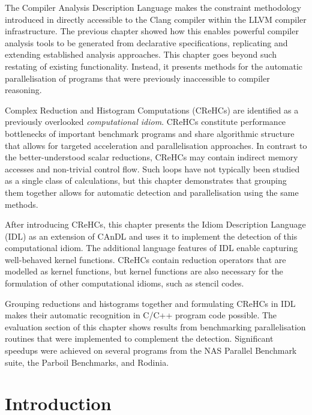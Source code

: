 
    The Compiler Analysis Description Language makes the constraint methodology
    introduced in  directly accessible to the Clang
    compiler within the LLVM compiler infrastructure.
    The previous chapter showed how this enables powerful compiler analysis
    tools to be generated from declarative specifications, replicating and
    extending established analysis approaches.
    This chapter goes beyond such restating of existing functionality.
    Instead, it presents methods for the automatic parallelisation of
    programs that were previously inaccessible to compiler reasoning.

    Complex Reduction and Histogram Computations (CReHCs) are identified as a
    previously overlooked  {\em computational idiom}.
    CReHCs constitute performance bottlenecks of important benchmark programs
    and share algorithmic structure that allows for targeted acceleration and
    parallelisation approaches.
    In contrast to the better-understood scalar reductions, CReHCs may contain
    indirect memory accesses and non-trivial control flow.
    Such loops have not typically been studied as a single class of
    calculations, but this chapter demonstrates that grouping them together
    allows for automatic detection and parallelisation using the same methods.

    After introducing CReHCs, this chapter presents the Idiom Description
    Language (IDL) as an extension of CAnDL and uses it to implement the
    detection of this computational idiom.
    The additional language features of IDL enable capturing well-behaved
    kernel functions.
    CReHCs contain reduction operators that are modelled as kernel functions,
    but kernel functions are also necessary for the formulation of other
    computational idioms, such as stencil codes.
    
    Grouping reductions and histograms together and formulating CReHCs in IDL
    makes their automatic recognition in C/C++ program code possible.
    The evaluation section of this chapter shows results from benchmarking
    parallelisation routines that were implemented to complement the detection.
    Significant speedups were achieved on several programs from the
    NAS Parallel Benchmark suite, the Parboil Benchmarks, and Rodinia.

\section{Introduction}

